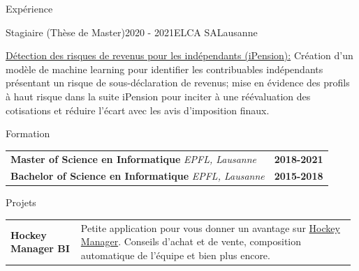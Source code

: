 \documentclass[
	a4paper, %
	10pt, %
]{resume} %
\newcommand{\lead}[1]{{\underline{#1}}}
\begin{document}
\begin{rSection}{Expérience}
	\begin{rSubsection}{Stagiaire (Thèse de Master)}{2020 - 2021}{ELCA SA}{Lausanne}
		\item \lead{Détection des risques de revenus pour les indépendants (iPension):} Création d'un modèle de machine learning pour identifier les contribuables indépendants présentant un risque de sous-déclaration de revenus; mise en évidence des profils à haut risque dans la suite iPension pour inciter à une réévaluation des cotisations et réduire l'écart avec les avis d'imposition finaux.
	\end{rSubsection}

\end{rSection}




\begin{rSection}{Formation}
	\noindent\begin{tabular*}{\linewidth}{@{}l@{\extracolsep{\fill}}r@{}}
		\textbf{Master of Science en Informatique} \textit{EPFL, Lausanne} & \textbf{2018-2021}\\
		\textbf{Bachelor of Science en Informatique} \textit{EPFL, Lausanne} & \textbf{2015-2018}\\[-0.2em]
	\end{tabular*}
\end{rSection}

\begin{rSection}{Projets}

	\begin{tabular}{@{}p{0.20\linewidth} p{0.78\linewidth}@{}}
		\textbf{Hockey Manager BI}     & Petite application pour vous donner un avantage sur \href{https://www.hockeymanager.ch/}{Hockey Manager}. Conseils d'achat et de vente, composition automatique de l'équipe et bien plus encore.
	\end{tabular}
\end{rSection}
\end{document}
